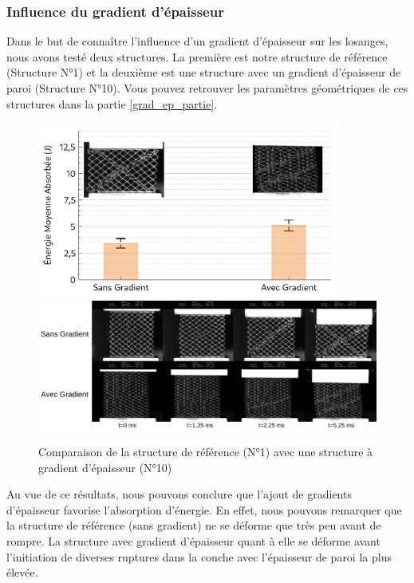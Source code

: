 \documentclass[a4paper]{article}
\begin{document}
	\subsubsection{Influence du gradient d'épaisseur}
	\label{gradep}
	\hspace{0.5cm}Dans le but de connaître l'influence d'un gradient d'épaisseur sur les losanges, nous avons testé deux structures. La première est notre structure de référence (Structure N°1) et la deuxième est une structure avec un gradient d'épaisseur de paroi (Structure N°10). Vous pouvez retrouver les paramètres géométriques de ces structures dans la partie \ref{grad_ep_partie}.
	
	\begin{figure}[H]
		\centering
		\includegraphics[width=10cm]{Images/7/7_4/7_4_1/comp_gradep.pdf}
		\includegraphics[width=16cm]{Images/7/7_4/7_4_1/instants.pdf}
		\caption{Comparaison de la structure de référence (N°1) avec une structure à gradient d'épaisseur (N°10)}
	\end{figure}

	Au vue de ce résultats, nous pouvons conclure que l'ajout de gradients d'épaisseur favorise l'absorption d'énergie. En effet, nous pouvons remarquer que la structure de référence (sans gradient) ne se déforme que très peu avant de rompre. La structure avec gradient d'épaisseur quant à elle se déforme avant l'initiation de diverses ruptures dans la couche avec l'épaisseur de paroi la plus élevée.
	\newpage
	
\end{document}
